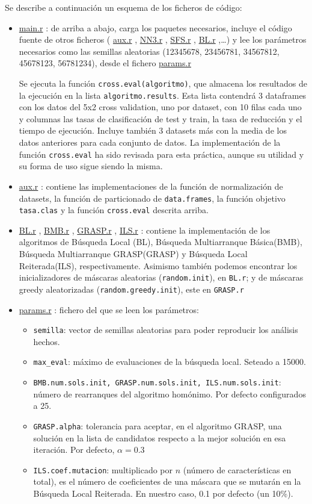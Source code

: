 \documentclass[a4paper,11pt]{article}
\newcommand{\hrefr}[1]{
\href{../bin/#1}{#1}
}
\begin{document}
Se describe a continuación un esquema de los ficheros de código:
\begin{itemize}
 \item \hrefr{main.r}: de arriba a abajo, carga los paquetes necesarios, incluye el código fuente de otros ficheros
  (\hrefr{aux.r}, \hrefr{NN3.r}, \hrefr{SFS.r}, \hrefr{BL.r},\ldots) y lee los parámetros necesarios como las 
  semillas aleatorias (12345678, 23456781, 34567812, 45678123, 56781234), desde el fichero \hrefr{params.r}
  
  Se ejecuta la función \texttt{cross.eval(algoritmo)}, que almacena los resultados de la ejecución en la lista
  \texttt{algoritmo.results}. Esta lista contendrá 3 dataframes con los datos del 5x2 cross validation, uno por dataset, 
  con 10 filas cada uno  y columnas las tasas de clasificación de test y train, la tasa de reducción y el tiempo de 
  ejecución. Incluye también 3 datasets más con la media de los datos anteriores para cada conjunto de datos. La implementación
  de la función \texttt{cross.eval} ha sido revisada para esta práctica, aunque su utilidad y su forma de uso sigue
  siendo la misma.
 
 \item \hrefr{aux.r}: contiene las implementaciones de la función de normalización de datasets, la función de
 particionado de \texttt{data.frames}, la función objetivo \texttt{tasa.clas} y la función \texttt{cross.eval}
 descrita arriba.
 
 \item \hrefr{BL.r}, \hrefr{BMB.r}, \hrefr{GRASP.r}, \hrefr{ILS.r}: contiene la implementación de los algoritmos de Búsqueda Local (BL), Búsqueda 
 Multiarranque Básica(BMB), Búsqueda Multiarranque GRASP(GRASP) y Búsqueda Local Reiterada(ILS), respectivamente. 
 Asimismo también podemos encontrar los inicializadores de máscaras aleatorias (\texttt{random.init}), en \texttt{BL.r};
 y de máscaras greedy aleatorizadas (\texttt{random.greedy.init}), este en \texttt{GRASP.r}
 
 \item \hrefr{params.r}: fichero del que se leen los parámetros:
  \begin{itemize}
    \item \texttt{semilla}: vector de semillas aleatorias para poder reproducir los análisis hechos.
    \item \texttt{max\_eval}: máximo de evaluaciones de la búsqueda local. Seteado a 15000.
    \item \texttt{BMB.num.sols.init, GRASP.num.sols.init, ILS.num.sols.init}: número de rearranques del algoritmo homónimo.
    Por defecto configurados a 25.
    \item \texttt{GRASP.alpha}: tolerancia para aceptar, en el algoritmo GRASP, una solución en la lista de candidatos 
    respecto a la mejor solución en esa iteración. Por defecto, $\alpha=0.3$
    \item \texttt{ILS.coef.mutacion}: multiplicado por $n$ (número de características en total), es el número de coeficientes
    de una máscara que se mutarán en la Búsqueda Local Reiterada. En nuestro caso, 0.1 por defecto (un 10\%).
  \end{itemize}
 \end{itemize}
 
\end{document}
